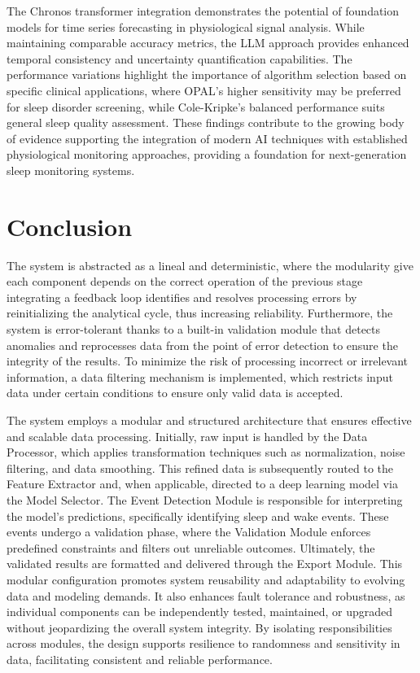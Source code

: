 \documentclass[conference]{IEEEtran}
\begin{document}
The Chronos transformer integration demonstrates the potential of foundation models for time series forecasting in physiological signal analysis. While maintaining comparable accuracy metrics, the LLM approach provides enhanced temporal consistency and uncertainty quantification capabilities. The performance variations highlight the importance of algorithm selection based on specific clinical applications, where OPAL's higher sensitivity may be preferred for sleep disorder screening, while Cole-Kripke's balanced performance suits general sleep quality assessment. These findings contribute to the growing body of evidence supporting the integration of modern AI techniques with established physiological monitoring approaches, providing a foundation for next-generation sleep monitoring systems.

\section{Conclusion}
	The system is abstracted as a lineal and deterministic, where the modularity 
	give each component depends on the correct operation of the previous stage integrating a feedback loop identifies
	and resolves processing errors by reinitializing the analytical cycle, thus increasing reliability. Furthermore, 
	the system is error-tolerant thanks to a built-in validation module that detects anomalies and reprocesses data
	from the point of error detection to ensure the integrity of the results. To minimize the risk of processing
	incorrect or irrelevant information, a data filtering mechanism is implemented, which restricts input data under
	certain conditions to ensure only valid data is accepted.

	The system employs a modular and structured architecture that ensures effective and scalable data processing. Initially, 
	raw input is handled by the Data Processor, which applies transformation techniques such as normalization, noise filtering,
	and data smoothing. This refined data is subsequently routed to the Feature Extractor and, when applicable, directed to a deep 
	learning model via the Model Selector. The Event Detection Module is responsible for interpreting the model's predictions, 
	specifically identifying sleep and wake events. These events undergo a validation phase, where the Validation Module enforces 
	predefined constraints and filters out unreliable outcomes. Ultimately, the validated results are formatted and delivered through
	the Export Module.
	This modular configuration promotes system reusability and adaptability to evolving data and modeling demands.
  It also enhances fault tolerance and robustness, as individual components can be independently tested, maintained,
  or upgraded without jeopardizing the overall system integrity. By isolating responsibilities across modules,
  the design supports resilience to randomness and sensitivity in data, facilitating consistent and reliable performance.
\end{document}
